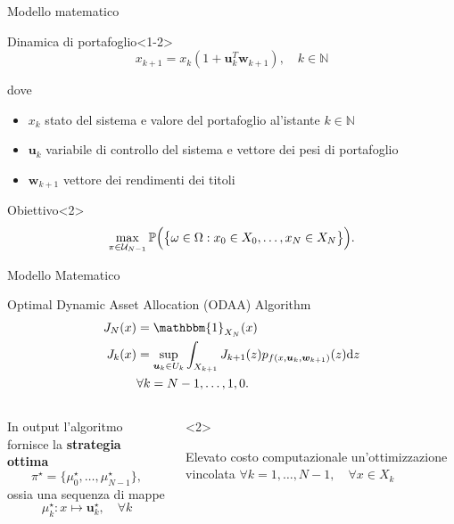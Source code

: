 \begin{frame}{Modello matematico}
	\begin{block}{Dinamica di portafoglio}<1-2>
		\begin{equation*}
		x_{k+1} = x_k(1+\bm{u}_k^T\bm{w}_{k+1}), \quad k \in \mathbb{N}
		\end{equation*}
	\end{block}
	dove
	\begin{itemize}
		\item $x_k$ stato del sistema e valore del portafoglio al'istante $k\in \mathbb{N}$
		\item $\bm{u}_k$ variabile di controllo del sistema e vettore dei pesi di portafoglio
		\item $\bm{w}_{k+1}$ vettore dei rendimenti dei titoli
	\end{itemize}
	\begin{block}{Obiettivo}<2>
		\begin{equation*}
		\operatorname*{max}_{\pi \in \mathcal{U}_{N-1}} \mathbb{P}\Big(\big\{\omega \in \Omega : x_0 \in X_0,\ldots,x_N \in X_N \big\} \Big).
		\end{equation*}
	\end{block}
\end{frame}	


\begin{frame}{Modello Matematico}
	\begin{block}{Optimal Dynamic Asset Allocation (ODAA) Algorithm}
		\begin{align*}
		J_N(x) & = \mathbbm{1}_{X_N}(x) \nonumber \\
		J_k(x) & = \sup_{\bm{u}_k \in U_k}\int_{X_{k+1}}J_{k+1}(z)p_{f(x,\bm{u}_k,\bm{w}_{k+1})}(z)\mathrm{d}z \\
		& \forall k = N-1,\ldots,1,0. 
		\end{align*}
	\end{block}
    \begin{columns}
	    \begin{column}{.5\textwidth}
	    	In output l'algoritmo fornisce la \textbf{strategia ottima} 
	    	\[ \pi^{\star} =  \{\mu_0^{\star},\ldots,\mu_{N-1}^{\star} \},  \]
	    	ossia una sequenza di mappe \[  \mu_k^{\star} \colon x \mapsto \bm{u}_{k}^{\star}, \quad \forall k  \]
	    \end{column}
	    \begin{column}{.5\textwidth}<2>
	    	\begin{alertblock}{Elevato costo computazionale}
	    		un'ottimizzazione vincolata $\forall k = 1,\ldots,N-1, \quad \forall x \in X_k$
	    	\end{alertblock}
	    \end{column}
    \end{columns}
	
\end{frame}

